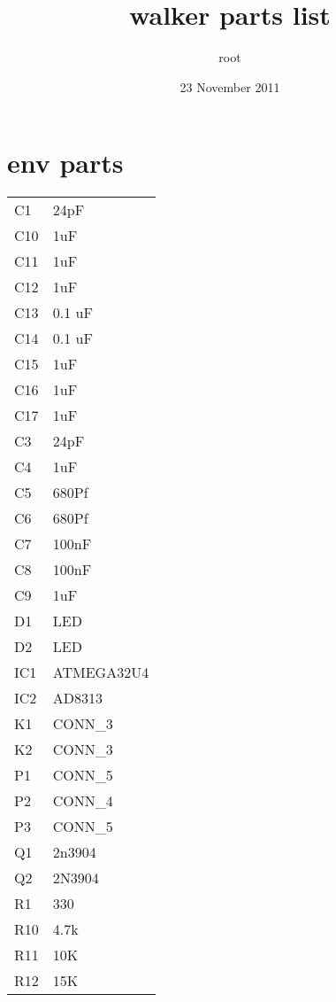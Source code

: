 \documentclass{article}
\title{walker parts list}
\author{root}
\date{23 November 2011}
\begin{document}
\maketitle



\section*{env parts}
\label{sec-1}



\begin{center}
\begin{tabular}{ll}
 C1   &  24pF        \\
 C10  &  1uF         \\
 C11  &  1uF         \\
 C12  &  1uF         \\
 C13  &  0.1 uF      \\
 C14  &  0.1 uF      \\
 C15  &  1uF         \\
 C16  &  1uF         \\
 C17  &  1uF         \\
 C3   &  24pF        \\
 C4   &  1uF         \\
 C5   &  680Pf       \\
 C6   &  680Pf       \\
 C7   &  100nF       \\
 C8   &  100nF       \\
 C9   &  1uF         \\
 D1   &  LED         \\
 D2   &  LED         \\
 IC1  &  ATMEGA32U4  \\
 IC2  &  AD8313      \\
 K1   &  CONN\_{}3   \\
 K2   &  CONN\_{}3   \\
 P1   &  CONN\_{}5   \\
 P2   &  CONN\_{}4   \\
 P3   &  CONN\_{}5   \\
 Q1   &  2n3904      \\
 Q2   &  2N3904      \\
 R1   &  330         \\
 R10  &  4.7k        \\
 R11  &  10K         \\
 R12  &  15K         \\

\end{tabular}
\end{center}
\end{document}
